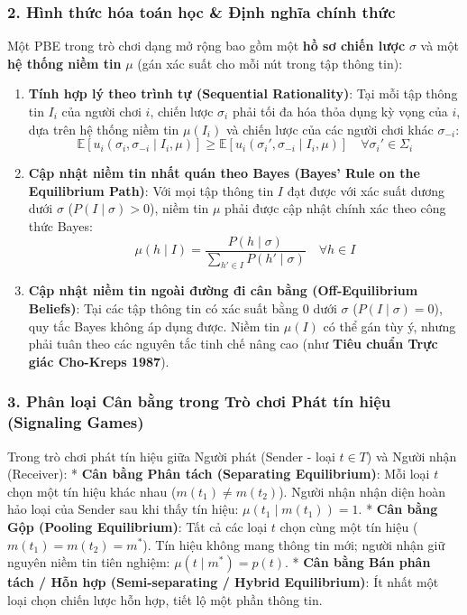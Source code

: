 \documentclass[
]{article}
\begin{document}
\subsubsection{2. Hình thức hóa toán học \& Định nghĩa chính
thức}\label{huxecnh-thux1ee9c-huxf3a-touxe1n-hux1ecdc-ux111ux1ecbnh-nghux129a-chuxednh-thux1ee9c-2}

Một PBE trong trò chơi dạng mở rộng bao gồm một \textbf{hồ sơ chiến
lược} \(\sigma\) và một \textbf{hệ thống niềm tin} \(\mu\) (gán xác suất
cho mỗi nút trong tập thông tin):

\begin{enumerate}
\def\labelenumi{\arabic{enumi}.}
\item
  \textbf{Tính hợp lý theo trình tự (Sequential Rationality)}: Tại mỗi
  tập thông tin \(I_i\) của người chơi \(i\), chiến lược \(\sigma_i\)
  phải tối đa hóa thỏa dụng kỳ vọng của \(i\), dựa trên hệ thống niềm
  tin \(\mu(I_i)\) và chiến lược của các người chơi khác
  \(\sigma_{-i}\):
  \[ \mathbb{E}[u_i(\sigma_i, \sigma_{-i} \mid I_i, \mu)] \ge \mathbb{E}[u_i(\sigma_i', \sigma_{-i} \mid I_i, \mu)] \quad \forall \sigma_i' \in \Sigma_i \]
\item
  \textbf{Cập nhật niềm tin nhất quán theo Bayes (Bayes' Rule on the
  Equilibrium Path)}: Với mọi tập thông tin \(I\) đạt được với xác suất
  dương dưới \(\sigma\) (\(P(I \mid \sigma) > 0\)), niềm tin \(\mu\)
  phải được cập nhật chính xác theo công thức Bayes:
  \[ \mu(h \mid I) = \frac{P(h \mid \sigma)}{\sum_{h' \in I} P(h' \mid \sigma)} \quad \forall h \in I \]
\item
  \textbf{Cập nhật niềm tin ngoài đường đi cân bằng (Off-Equilibrium
  Beliefs)}: Tại các tập thông tin có xác suất bằng 0 dưới \(\sigma\)
  (\(P(I \mid \sigma) = 0\)), quy tắc Bayes không áp dụng được. Niềm tin
  \(\mu(I)\) có thể gán tùy ý, nhưng phải tuân theo các nguyên tắc tinh
  chế nâng cao (như \textbf{Tiêu chuẩn Trực giác Cho-Kreps 1987}).
\end{enumerate}

\subsubsection{3. Phân loại Cân bằng trong Trò chơi Phát tín hiệu
(Signaling
Games)}\label{phuxe2n-loux1ea1i-cuxe2n-bux1eb1ng-trong-truxf2-chux1a1i-phuxe1t-tuxedn-hiux1ec7u-signaling-games}

Trong trò chơi phát tín hiệu giữa Người phát (Sender - loại \(t \in T\))
và Người nhận (Receiver): * \textbf{Cân bằng Phân tách (Separating
Equilibrium)}: Mỗi loại \(t\) chọn một tín hiệu khác nhau
(\(m(t_1) \neq m(t_2)\)). Người nhận nhận diện hoàn hảo loại của Sender
sau khi thấy tín hiệu: \(\mu(t_1 \mid m(t_1)) = 1\). * \textbf{Cân bằng
Gộp (Pooling Equilibrium)}: Tất cả các loại \(t\) chọn cùng một tín hiệu
(\(m(t_1) = m(t_2) = m^*\)). Tín hiệu không mang thông tin mới; người
nhận giữ nguyên niềm tin tiên nghiệm: \(\mu(t \mid m^*) = p(t)\). *
\textbf{Cân bằng Bán phân tách / Hỗn hợp (Semi-separating / Hybrid
Equilibrium)}: Ít nhất một loại chọn chiến lược hỗn hợp, tiết lộ một
phần thông tin.
\end{document}
